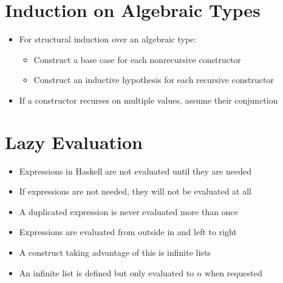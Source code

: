 \documentclass{article}
\begin{document}
\section{Induction on Algebraic Types}

\begin{itemize}
\item For structural induction over an algebraic type:
\begin{itemize}
\item Construct a base case for each nonrecursive constructor
\item Construct an inductive hypothesis for each recursive constructor
\end{itemize}
\item If a constructor recurses on multiple values, assume their conjunction
\end{itemize}

\section{Lazy Evaluation}

\begin{itemize}
\item Expressions in Haskell are not evaluated until they are needed
\item If expressions are not needed, they will not be evaluated at all
\item A duplicated expression is never evaluated more than once
\item Expressions are evaluated from outside in and left to right
\item A construct taking advantage of this is infinite lists
\item An infinite list is defined but only evaluated to $n$ when requested
\end{itemize}
\end{document}

